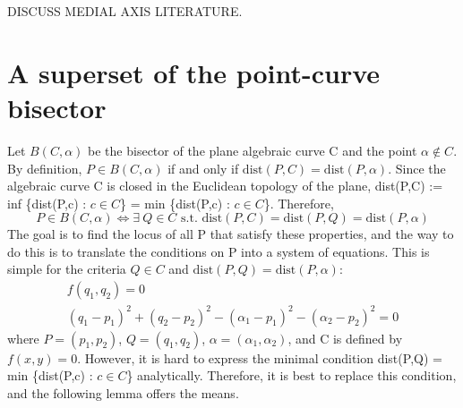 

DISCUSS MEDIAL AXIS LITERATURE.

\section{A superset of the point-curve bisector}
\label{sec-sup1}


Let $B(C,\alpha)$ be the bisector of the plane algebraic curve C and the 
point $\alpha \not \in C$.
By definition, $P \in B(C,\alpha)$ if and only if 
$\mbox{dist}(P,C) = \mbox{dist}(P,\alpha)$.
Since the algebraic curve C is closed in the Euclidean topology of the plane,
dist(P,C) := inf \{dist(P,c) : $c \in C$\} = min \{dist(P,c) : $c \in C$\}.
Therefore, 
\[ P \in B(C,\alpha) \Leftrightarrow \exists\ Q \in C \mbox{ s.t. } 
\mbox{dist}(P,C) = \mbox{dist}(P,Q) = \mbox{dist}(P,\alpha) \]
The goal is to find the locus of all P that satisfy these properties, and 
the way to do this is to translate the conditions on P into a system 
of equations.
This is simple for the criteria $Q \in C$ and 
$\mbox{dist}(P,Q) = \mbox{dist}(P,\alpha)$:
%
\begin{eqnarray}
	f(q_{1},q_{2})=0 \\
%
	(q_{1} - p_{1})^{2} + (q_{2} - p_{2})^{2} - (\alpha_{1} - p_{1})^{2} - 
	(\alpha_{2} - p_{2})^{2} = 0
\end{eqnarray}
%
where $P = (p_{1},p_{2})$, $Q = (q_{1},q_{2})$, 
$\alpha = (\alpha_{1},\alpha_{2})$,
and C is defined by $f(x,y) = 0$.
However, it is hard 
to express the minimal condition dist(P,Q) = min \{dist(P,c) : $c \in C$\} 
analytically.
Therefore, it is best to replace this condition, and the following lemma 
offers the means.

